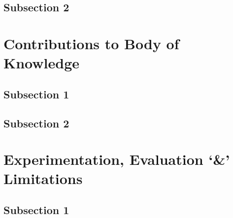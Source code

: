 
\subsection{Subsection 2}







\section{Contributions to Body of Knowledge}



\subsection{Subsection 1}




\subsection{Subsection 2}





\section{Experimentation, Evaluation `\&' Limitations}


\subsection{Subsection 1}


